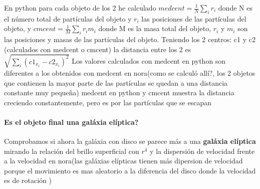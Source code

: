 \documentclass[12pt]{article} %
\renewcommand{\=}[1]{\stackrel{#1}{=}} %
\theoremstyle{definition}
\theoremstyle{remark}
\begin{document}
En python para cada objeto de los 2 he calculado $medcent = \frac{1}{N}\sum_i{r_i}$ donde N es el número total de partículas del objeto y $r_i$ las posiciones de las partículas del objeto, 
y $cmcent = \frac{1}{M}\sum_i{r_i m_i}$ donde M es la masa total del objeto, $r_i$ y $m_i$ son las posiciones y masas de las partículas del objeto.
Teniendo los 2 centros: c1 y c2 (calculados con medcent o cmcent) la distancia entre los 2 es $\sqrt{\sum_i{(c1_{x_i} - c2_{x_i})^2}}$
Los valores calculados con medcent en python  son diferentes a los obtenidos con medcent en nora(como se calculó allí?, los 2 objetos que contienen la mayor parte de las partículas se quedan a una distancia constante muy pequeña)
medcent en python y cmcent muestra la distancia creciendo constantemente, pero es por las partículas que se escapan



\clearpage
\paragraph{Es el objeto final una galáxia elíptica?}
Comprobamos si ahora la galáxia con disco se parece más a una \textbf{galáxia elíptica} mirando la relación del brillo superficial con $r^4$ y 
la dispersión de velocidad frente a la velocidad en nora(las galáxias elípticas tienen más dipersion de 
velocidad porque el movimiento es mas aleatorio a la diferencia del disco donde la velocidad es de rotación )
\end{document}
